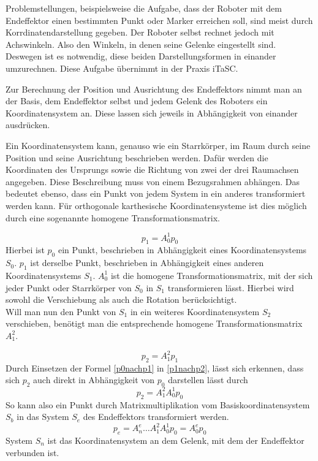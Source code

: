 \documentclass[a4paper,12pt,twoside,openright,DIV=9
]{scrbook}
\begin{document}
Problemstellungen, beispielsweise die Aufgabe, dass der Roboter mit dem Endeffektor einen bestimmten Punkt oder Marker erreichen soll, sind meist durch Korrdinatendarstellung gegeben. Der Roboter selbst rechnet jedoch mit Achswinkeln. Also den Winkeln, in denen seine Gelenke eingestellt sind. Deswegen ist es notwendig, diese beiden Darstellungsformen in einander umzurechnen. Diese Aufgabe übernimmt in der Praxis iTaSC. 

Zur Berechnung der Position und Ausrichtung des Endeffektors nimmt man an der Basis, dem Endeffektor selbst und jedem Gelenk des Roboters ein Koordinatensystem an. Diese lassen sich jeweils in Abhängigkeit von einander ausdrücken.

Ein Koordinatensystem kann, genauso wie ein Starrkörper, im Raum durch seine Position und seine Ausrichtung beschrieben werden. Dafür werden die Koordinaten des Ursprungs sowie die Richtung von zwei der drei Raumachsen angegeben. Diese Beschreibung muss von einem Bezugsrahmen abhängen. %
Das bedeutet ebenso, dass ein Punkt von jedem System in ein anderes transformiert werden kann. Für orthogonale karthesische Koordinatensysteme ist dies möglich durch eine sogenannte homogene Transformationsmatrix. \cite{Siciliano}

\begin{equation}
p_1=A_0^1p_0
\label{p0nachp1}
\end{equation}
Hierbei ist $p_0$ ein Punkt, beschrieben in Abhängigkeit eines Koordinatensystems $S_0$. $p_1$ ist derselbe Punkt, beschrieben in Abhängigkeit eines anderen Koordinatensystems $S_1$. $A_0^1$ ist die homogene Transformationsmatrix, mit der sich jeder Punkt oder Starrkörper von $S_0$ in $S_1$ transformieren lässt. Hierbei wird sowohl die Verschiebung als auch die Rotation berücksichtigt. \\ 
Will man nun den Punkt von $S_1$ in ein weiteres Koordinatensystem $S_2$ verschieben, benötigt man die entsprechende homogene Transformationsmatrix $A_1^2$.

\begin{equation}
p_2=A_1^2p_1
\label{p1nachp2}
\end{equation}
Durch Einsetzen der Formel \ref{p0nachp1} in \ref{p1nachp2}, lässt sich erkennen, dass sich $p_2$ auch direkt in Abhängigkeit von $p_0$ darstellen lässt durch
\begin{equation}
p_2=A_1^2A_0^1p_0
\label{p0nachp2}
\end{equation}
So kann also ein Punkt durch Matrixmultiplikation vom Basiskoordinatensystem $S_b$ in das System $S_e$ des Endeffektors transformiert werden. 
\begin{equation}
p_e=A_n^e \dots A_1^2A_0^1p_0=A_0^ep_0
\label{p0nachpe}
\end{equation}
System $S_n$ ist das Koordinatensystem an dem Gelenk, mit dem der Endeffektor verbunden ist.
\end{document}
